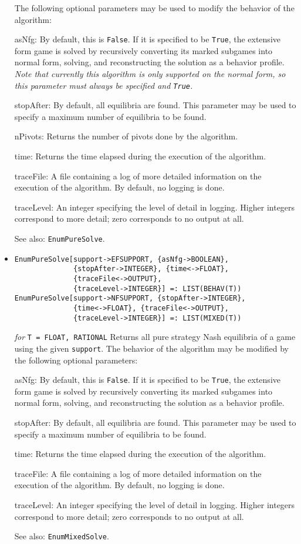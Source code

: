 \begin{itemize}
The following optional parameters may be used to modify the behavior
of the algorithm:
\bd
\item
[asNfg:] By default, this is \verb+False+.  If it is specified to be
\verb+True+, the extensive form game is solved by recursively converting
its marked subgames into normal form, solving, and reconstructing the
solution as a behavior profile.  {\it Note that currently this algorithm
is only supported on the normal form, so this parameter
must always be specified and {\tt True}.} 
\item
[stopAfter:] By default, all equilibria are found.  This parameter may
be used to specify a maximum number of equilibria to be found.
\item
[nPivots:] Returns the number of pivots done by the
algorithm.
\item
[time:] Returns the time elapsed during the execution
of the algorithm.
\item
[traceFile:] A file containing a log of more detailed information on the
execution of the algorithm.  By default, no logging is done.
\item
[traceLevel:] An integer specifying the level of detail in logging.
Higher integers correspond to more detail; zero corresponds to no output
at all.
\ed
\item [See also:] \verb+EnumPureSolve+.
\ed

\item{}
\protect \large \begin{verbatim}
EnumPureSolve[support->EFSUPPORT, {asNfg->BOOLEAN},
              {stopAfter->INTEGER}, {time<->FLOAT},
              {traceFile<->OUTPUT},
              {traceLevel->INTEGER}] =: LIST(BEHAV(T))
EnumPureSolve[support->NFSUPPORT, {stopAfter->INTEGER},
              {time<->FLOAT}, {traceFile<->OUTPUT},
              {traceLevel->INTEGER}] =: LIST(MIXED(T)) 
\end{verbatim}\normalsize

{\it for} {\tt T = FLOAT, RATIONAL}
\bd
Returns all pure strategy Nash equilibria of a game using the given
\verb+support+.  The behavior
of the algorithm may be modified by the following optional parameters:
\bd
\item
[asNfg:] By default, this is \verb+False+.  If it is specified to be
\verb+True+, the extensive form game is solved by recursively converting
its marked subgames into normal form, solving, and reconstructing the
solution as a behavior profile.
\item
[stopAfter:] By default, all equilibria are found.  This parameter may
be used to specify a maximum number of equilibria to be found.
\item
[time:] Returns the time elapsed during the execution
of the algorithm.
\item
[traceFile:] A file containing a log of more detailed information on the
execution of the algorithm.  By default, no logging is done.
\item
[traceLevel:] An integer specifying the level of detail in logging.  Higher
integers correspond to more detail; zero corresponds to no output at all.
\ed
\item
[See also:] \verb+EnumMixedSolve+.
\ed


\end{itemize}
